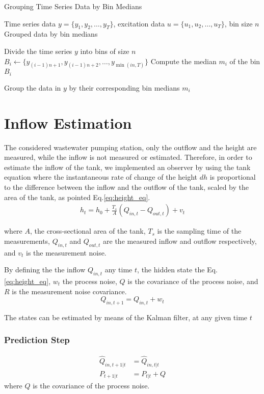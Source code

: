 	\begin{algorithm}
		\caption{Grouping Time Series Data by Bin Medians}
		\begin{algorithmic}[1]
		\REQUIRE Time series data \( y = \{y_1, y_2, \ldots, y_T\} \), excitation data \( u = \{u_1, u_2, \ldots, u_T\} \), bin size \( n \)
		\ENSURE Grouped data by bin medians
		
		\STATE Divide the time series \( y \) into bins of size \( n \)
			\STATE $B_i \gets \{ y_{(i-1)n+1}, y_{(i-1)n+2}, \ldots, y_{\min(in, T)} \}$
			\STATE Compute the median \( m_i \) of the bin \( B_i \)
		\ENDFOR
		
		\STATE Group the data in \( y \) by their corresponding bin medians \( m_i \)
		
		\end{algorithmic}
		\end{algorithm}


\section{Inflow Estimation}

	The considered wastewater pumping station, only the outflow and the height are measured, 
	while the inflow is not measured or estimated. Therefore, in order to estimate the inflow of the tank, 
	we implemented an observer by using the tank equation where the instantaneous rate of change of the height $dh$ is proportional 
	to the difference between the inflow and the outflow of the tank, scaled by the area of the tank, as pointed Eq.\ref{eq:height_eq}.
	\begin{align}
	h_t = h_0 + \frac{T_s}{A}(Q_{in,t} - Q_{out,t}) + v_t \label{eq:height_eq}
	\end{align}

	\noindent where \( A \), the cross-sectional area of the tank, $T_s$ is the sampling time of the measurements,
	$Q_{in,t}$ and $Q_{out,t}$ are the measured inflow and outflow respectively, and $v_t$ is the measurement noise. 

	By defining the the inflow  \( Q_{in,t} \) any time \( t \), the hidden state the 
	Eq.\ref{eq:height_eq}, \( w_t \) the process noise, \( Q \) is the covariance of the process noise, and \( R \) is the measurement noise covariance.
	\[
	Q_{in, t+1} = Q_{in, t} + w_t
	\]
	
	\noindent The states can be estimated by means of the Kalman filter, at any given time \( t \)
	\subsubsection*{Prediction Step}
	\begin{align*}
	\hat{Q}_{in, t+1|t} &= \hat{Q}_{in,t|t} \\
	P_{t+1|t} &= P_{t|t} + Q
	\end{align*}
	where \( Q \) is the covariance of the process noise.

